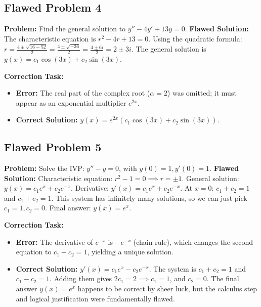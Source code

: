 \documentclass[11pt, a4paper]{article}
\theoremstyle{definition}
\theoremstyle{remark}
\begin{document}
\subsection*{Flawed Problem 4}
\textbf{Problem:} Find the general solution to $y'' - 4y' + 13y = 0$.
\textbf{Flawed Solution:}
The characteristic equation is $r^2 - 4r + 13 = 0$.
Using the quadratic formula: $r = \frac{4 \pm \sqrt{16 - 52}}{2} = \frac{4 \pm \sqrt{-36}}{2} = \frac{4 \pm 6i}{2} = 2 \pm 3i$.
The general solution is $y(x) = c_1 \cos(3x) + c_2 \sin(3x)$.

\textbf{Correction Task:}
\begin{itemize}
    \item \textbf{Error:} The real part of the complex root ($\alpha = 2$) was omitted; it must appear as an exponential multiplier $e^{2x}$.
    \item \textbf{Correct Solution:} $y(x) = e^{2x}(c_1 \cos(3x) + c_2 \sin(3x))$.
\end{itemize}

\subsection*{Flawed Problem 5}
\textbf{Problem:} Solve the IVP: $y'' - y = 0$, with $y(0)=1, y'(0)=1$.
\textbf{Flawed Solution:}
Characteristic equation: $r^2 - 1 = 0 \implies r = \pm 1$.
General solution: $y(x) = c_1 e^x + c_2 e^{-x}$.
Derivative: $y'(x) = c_1 e^x + c_2 e^{-x}$.
At $x=0$: $c_1 + c_2 = 1$ and $c_1 + c_2 = 1$.
This system has infinitely many solutions, so we can just pick $c_1 = 1, c_2 = 0$.
Final answer: $y(x) = e^x$.

\textbf{Correction Task:}
\begin{itemize}
    \item \textbf{Error:} The derivative of $e^{-x}$ is $-e^{-x}$ (chain rule), which changes the second equation to $c_1 - c_2 = 1$, yielding a unique solution.
    \item \textbf{Correct Solution:} $y'(x) = c_1 e^x - c_2 e^{-x}$. The system is $c_1 + c_2 = 1$ and $c_1 - c_2 = 1$. Adding them gives $2c_1 = 2 \implies c_1 = 1$, and $c_2 = 0$. The final answer $y(x) = e^x$ happens to be correct by sheer luck, but the calculus step and logical justification were fundamentally flawed.
\end{itemize}
\end{document}

